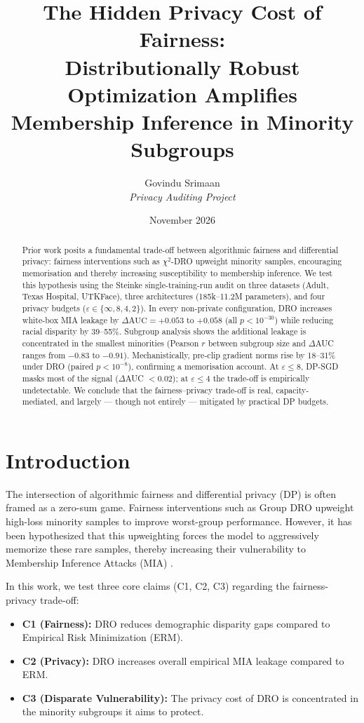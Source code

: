 \documentclass[11pt, a4paper]{article}
\title{The Hidden Privacy Cost of Fairness: \\ Distributionally Robust Optimization Amplifies Membership Inference in Minority Subgroups}
\author{Govindu Srimaan \\ \textit{Privacy Auditing Project}}
\date{November 2026}
\begin{document}
\maketitle

\begin{abstract}
Prior work posits a fundamental trade-off between algorithmic fairness and differential privacy: fairness interventions such as $\chi^2$-DRO upweight minority samples, encouraging memorisation and thereby increasing susceptibility to membership inference. We test this hypothesis using the Steinke single-training-run audit on three datasets (Adult, Texas Hospital, UTKFace), three architectures (185k--11.2M parameters), and four privacy budgets ($\varepsilon \in \{\infty, 8, 4, 2\}$). In every non-private configuration, DRO increases white-box MIA leakage by $\Delta\text{AUC} = {+}0.053$ to ${+}0.058$ (all $p < 10^{-30}$) while reducing racial disparity by 39--55\%. Subgroup analysis shows the additional leakage is concentrated in the smallest minorities (Pearson $r$ between subgroup size and $\Delta$AUC ranges from $-0.83$ to $-0.91$). Mechanistically, pre-clip gradient norms rise by 18--31\% under DRO (paired $p < 10^{-8}$), confirming a memorisation account. At $\varepsilon \le 8$, DP-SGD masks most of the signal ($\Delta$AUC $< 0.02$); at $\varepsilon \le 4$ the trade-off is empirically undetectable. We conclude that the fairness--privacy trade-off is real, capacity-mediated, and largely --- though not entirely --- mitigated by practical DP budgets.
\end{abstract}

\section{Introduction}

The intersection of algorithmic fairness and differential privacy (DP) is often framed as a zero-sum game. Fairness interventions such as Group DRO \cite{sagawa2020} upweight high-loss minority samples to improve worst-group performance. However, it has been hypothesized that this upweighting forces the model to aggressively memorize these rare samples, thereby increasing their vulnerability to Membership Inference Attacks (MIA) \cite{shokri2017}.

In this work, we test three core claims (C1, C2, C3) regarding the fairness-privacy trade-off:
\begin{itemize}
    \item \textbf{C1 (Fairness):} DRO reduces demographic disparity gaps compared to Empirical Risk Minimization (ERM).
    \item \textbf{C2 (Privacy):} DRO increases overall empirical MIA leakage compared to ERM.
    \item \textbf{C3 (Disparate Vulnerability):} The privacy cost of DRO is concentrated in the minority subgroups it aims to protect.
\end{itemize}
\end{document}
